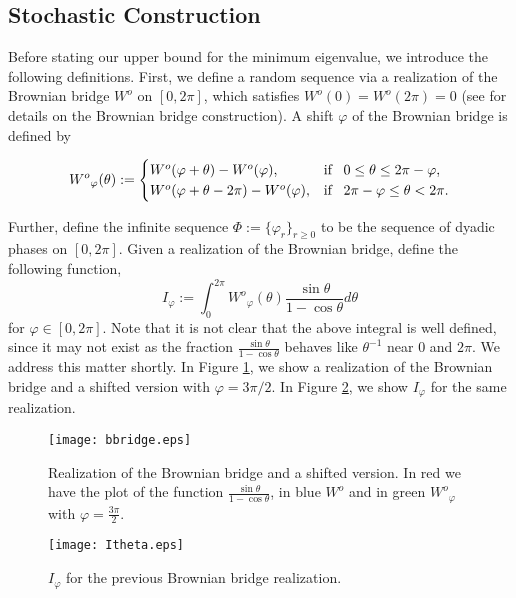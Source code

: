 \documentclass[smallextended]{svjour3}
\begin{document}
\subsection{Stochastic Construction}

Before stating our upper bound for the minimum eigenvalue, we introduce the following definitions.
First, we define a random sequence via a realization of the Brownian bridge ${W^o}$ on $[0,2\pi]$, which satisfies
${W^o}(0) = {W^o}(2\pi) = 0$ (see \cite{Billingsley} for details on the Brownian bridge construction). A shift $\varphi$ of the Brownian bridge is defined by

\begin{equation*}
{W^o}_\varphi(\theta) :=
\begin{cases}
{W^o}(\varphi+\theta) - {W^o}(\varphi), & \text{if \,\,\,} 0\leq \theta\leq 2\pi -\varphi,\\
{W^o}(\varphi+\theta-2\pi) - {W^o}(\varphi), & \text{if \,\,\,} 2\pi - \varphi \leq \theta < 2 \pi. 
\end{cases}
\end{equation*}

Further, define the infinite sequence $\Phi:=\{\varphi_r\}_{r\geq 0}$ to be the sequence of dyadic phases on $[0,2\pi]$. Given a realization of the Brownian bridge, define the following function,
$$
I_\varphi :=  \int_0^{2\pi} {W^o}_\varphi(\theta) \frac{\sin \theta}{1 - \cos \theta} d \theta
$$
for $\varphi\in[0,2\pi]$. Note that it is not clear that the above integral is well defined, since it may not exist as the fraction
$ \frac{\sin \theta}{1 - \cos \theta}$ behaves like $\theta^{-1}$ near $0$ and $2 \pi$. We address this
matter shortly. In Figure \ref{fig_brownrlse}, we show a realization of the Brownian bridge and a shifted version with $\varphi=3\pi/2$. In Figure \ref{fig_integ}, we show 
$I_\varphi$ for the same realization.

\begin{figure}[!Ht]
  \begin{center}
    \texttt{[image: bbridge.eps]}
    \caption{Realization of the Brownian bridge and a shifted version. In red we have the plot of the function $\frac{\sin\theta}{1-\cos\theta}$, in blue ${W^o}$ and in green ${W^o}_{\varphi}$ with $\varphi=\frac{3\pi}{2}$.}
    \label{fig_brownrlse}
  \end{center}
\end{figure}

\begin{figure}[!Ht]
  \begin{center}
    \texttt{[image: Itheta.eps]}
    \caption{$I_\varphi$ for the previous Brownian bridge realization.}
    \label{fig_integ}
  \end{center}
\end{figure}
\end{document}
